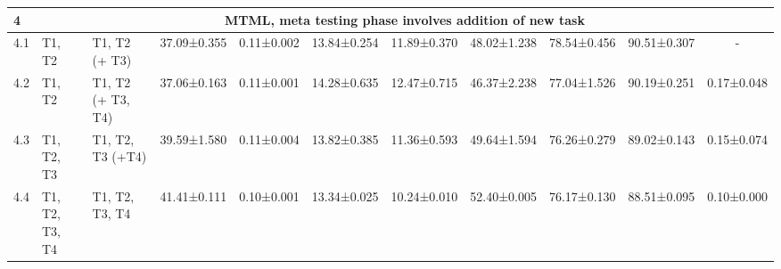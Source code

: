 \documentclass[conference]{IEEEtran}
\begin{document}
\begin{table*}[t]
\begin{tiny}
{\begin{tabular}{lllcccccccc}
\textbf{4} &
  \multicolumn{10}{c}{\textbf{\ac{MTML}, meta testing phase involves addition of new task}} \\ \hline
4.1 &
  T1, T2 &
  T1, T2 (+ T3) &
  37.09±0.355 &
  0.11±0.002 &
  13.84±0.254 &
  11.89±0.370 &
  48.02±1.238 &
  78.54±0.456 &
  90.51±0.307 &
 -  \\
4.2 &
  T1, T2 &
  T1, T2 (+ T3, T4) &
  37.06±0.163 &
  0.11±0.001 &
  14.28±0.635 &
  12.47±0.715 &
  46.37±2.238 &
  77.04±1.526 &
  90.19±0.251 &
  0.17±0.048 \\
4.3 &
  T1, T2, T3 &
  T1, T2, T3 (+T4) &
  39.59±1.580 &
  0.11±0.004 &
  13.82±0.385 &
  11.36±0.593 &
  49.64±1.594 &
  76.26±0.279 &
  89.02±0.143 &
  0.15±0.074 \\ 
  4.4 & T1, T2, T3, T4 & T1, T2, T3, T4 & 41.41±0.111 & 0.10±0.001 & 13.34±0.025 & 10.24±0.010 & 52.40±0.005 & 76.17±0.130 & 88.51±0.095 & 0.10±0.000 \\ \hline


\end{tabular}}
\end{tiny}
\end{table*}
\end{document}
